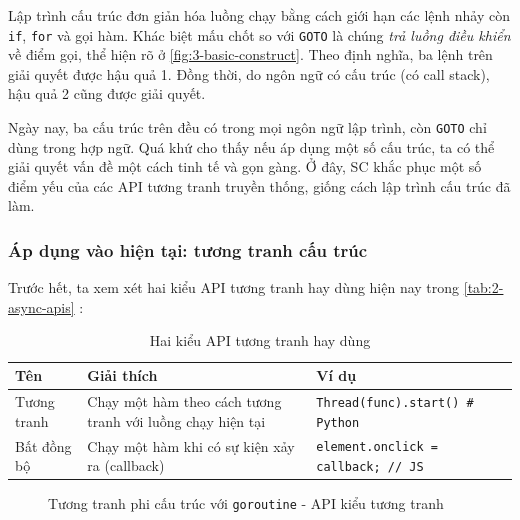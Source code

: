 \documentclass[../../thesis]{subfiles}
\begin{document}
Lập trình cấu trúc đơn giản hóa luồng chạy bằng cách giới hạn các lệnh nhảy còn
\texttt{if}, \texttt{for} và gọi hàm. Khác biệt mấu chốt so với \texttt{GOTO} là
chúng \emph{trả luồng điều khiển} về điểm gọi, thể hiện rõ ở
\autoref{fig:3-basic-construct}. Theo định nghĩa, ba lệnh trên giải quyết được
hậu quả 1. Đồng thời, do ngôn ngữ có cấu trúc (có call stack), hậu quả 2 cũng
được giải quyết.

Ngày nay, ba cấu trúc trên đều có trong mọi ngôn ngữ lập trình, còn
\texttt{GOTO} chỉ dùng trong hợp ngữ. Quá khứ cho thấy nếu áp dụng một số cấu
trúc, ta có thể giải quyết vấn đề một cách tinh tế và gọn gàng. Ở đây, SC khắc
phục một số điểm yếu của các API tương tranh truyền thống, giống cách lập trình
cấu trúc đã làm.

\subsubsection{Áp dụng vào hiện tại: tương tranh cấu trúc}

Trước hết, ta xem xét hai kiểu API tương tranh hay dùng hiện nay trong
\autoref{tab:2-async-apis} \cite{NJS_SC}:


\begin{table}[H]
    \centering
    \caption{Hai kiểu API tương tranh hay dùng \cite{NJS_SC}}
    \label{tab:2-async-apis}
    \begin{tabular}{l p{5.5cm} l}
        \toprule
        Tên         & Giải thích                                                 & Ví dụ \\
        \midrule
        Tương tranh & Chạy một hàm theo cách tương tranh với luồng chạy hiện tại & \texttt{Thread(func).start() # Python} \\
        Bất đồng bộ & Chạy một hàm khi có sự kiện xảy ra (callback)              & \texttt{element.onclick = callback; // JS} \\
        \bottomrule
    \end{tabular}
\end{table}

\begin{figure}
    \centering
    \vspace*{-6mm}
    
    \vspace*{-10mm}
    \caption{Tương tranh phi cấu trúc với \texttt{goroutine} - API kiểu tương
        tranh \cite{NJS_SC}}
    \label{fig:goroutine}
\end{figure}
\end{document}

